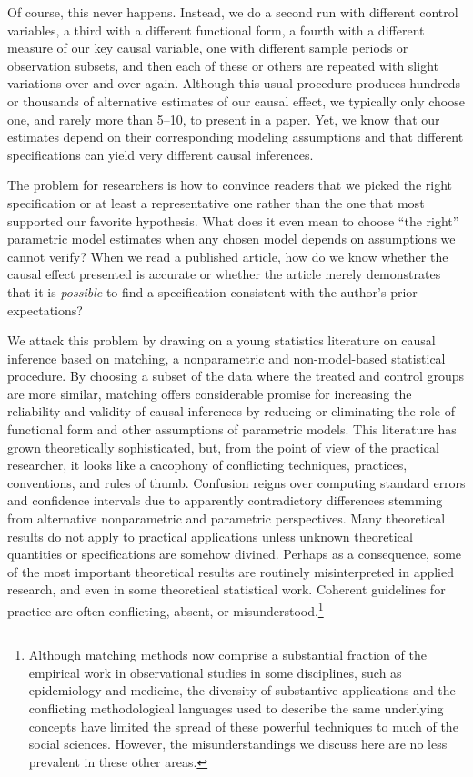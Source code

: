 \documentclass[11pt,titlepage]{article}
\begin{document}
Of course, this never happens.  Instead, we do a second run with
different control variables, a third with a different functional form,
a fourth with a different measure of our key causal variable, one with
different sample periods or observation subsets, and then each of
these or others are repeated with slight variations over and over
again.  Although this usual procedure produces hundreds or thousands
of alternative estimates of our causal effect, we typically only
choose one, and rarely more than 5--10, to present in a paper.  Yet,
we know that our estimates depend on their corresponding modeling
assumptions and that different specifications can yield very different
causal inferences.

The problem for researchers is how to convince readers that we picked
the right specification or at least a representative one rather than
the one that most supported our favorite hypothesis.  What does it
even mean to choose ``the right'' parametric model estimates when any
chosen model depends on assumptions we cannot verify?  When we read a
published article, how do we know whether the causal effect presented
is accurate or whether the article merely demonstrates that it is
\emph{possible} to find a specification consistent with the author's
prior expectations?

We attack this problem by drawing on a young statistics literature on
causal inference based on matching, a nonparametric and
non-model-based statistical procedure.  By choosing a subset of the
data where the treated and control groups are more similar, matching
offers considerable promise for increasing the reliability and
validity of causal inferences by reducing or eliminating the role of
functional form and other assumptions of parametric models.  This
literature has grown theoretically sophisticated, but, from the point
of view of the practical researcher, it looks like a cacophony of
conflicting techniques, practices, conventions, and rules of thumb.
Confusion reigns over computing standard errors and confidence
intervals due to apparently contradictory differences stemming from
alternative nonparametric and parametric perspectives.  Many
theoretical results do not apply to practical applications unless
unknown theoretical quantities or specifications are somehow divined.
Perhaps as a consequence, some of the most important theoretical
results are routinely misinterpreted in applied research, and even in
some theoretical statistical work.  Coherent guidelines for practice
are often conflicting, absent, or misunderstood.\footnote{Although
  matching methods now comprise a substantial fraction of the
  empirical work in observational studies in some disciplines, such as
  epidemiology and medicine, the diversity of substantive applications
  and the conflicting methodological languages used to describe the
  same underlying concepts have limited the spread of these powerful
  techniques to much of the social sciences.  However, the
  misunderstandings we discuss here are no less prevalent in these
  other areas.}
\end{document}
